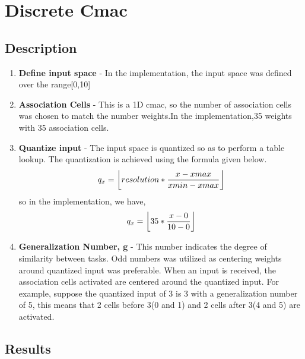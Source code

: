 \documentclass{article}
\DeclarePairedDelimiter\floor{\lfloor}{\rfloor}
\begin{document}
\section{Discrete Cmac}
\subsection{Description}
 \begin{enumerate}
   \item \textbf{Define input space} - In the implementation, the input space was defined over the range[0,10]
   \item \textbf{Association Cells} - This is a 1D cmac, so the number of association cells was chosen to match the number
    weights.In the implementation,35 weights with 35 association cells.
   \item \textbf{Quantize input} - The input space is quantized so as to perform a table lookup. The quantization is achieved
     using the formula given below.
     \begin{equation}
       q_x = \floor*{resolution*\frac{x - xmax}{xmin-xmax}}
     \end{equation}
     so in the implementation, we have,
     \begin{equation}
       q_x = \floor*{35*\frac{x- 0}{10 - 0}}
     \end{equation}
   \item \textbf{Generalization Number, g} - This number indicates the degree of similarity between tasks. Odd numbers was utilized as centering weights around quantized input was preferable. When an input is received, the association cells activated are centered around the quantized input. For example, suppose the quantized input of 3 is 3 with a generalization number of 5, this means that 2 cells before 3(0 and 1) and 2 cells after 3(4 and 5) are activated.

 \end{enumerate}
\subsection{Results}
\end{document}
